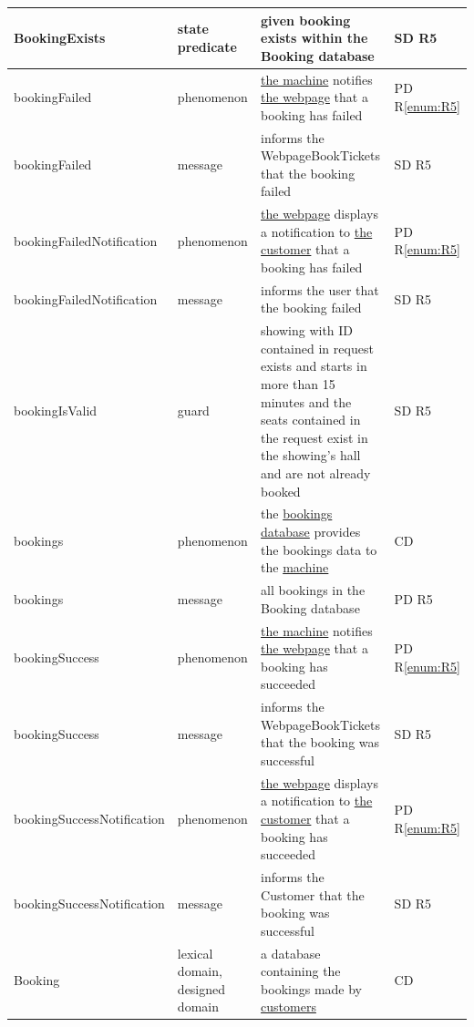 \documentclass[a4paper,10pt,titlepage,bibtotoc,bibtotocnumbered]{scrreprt}
\begin{document}
\begin{longtable}{|p{4.75cm}|p{3cm}|p{5cm}|l|}
BookingExists & state predicate & given booking exists within the Booking database & SD R5\\
\hline
\hypertarget{glossary:bookingFailed}{bookingFailed} & phenomenon & \hyperlink{glossary:UDEKino}{the machine} notifies \hyperlink{glossary:WebpageBookTickets}{the webpage} that a booking has failed & PD R\ref{enum:R5}\\
\hline
bookingFailed & message & informs the WebpageBookTickets that the booking failed & SD R5\\
\hline
\hypertarget{glossary:bookingFailedNotification}{bookingFailedNotification} & phenomenon & \hyperlink{glossary:WebpageBookTickets}{the webpage} displays a notification to \hyperlink{glossary:Customer}{the customer} that a booking has failed & PD R\ref{enum:R5}\\
\hline
bookingFailedNotification & message & informs the user that the booking failed & SD R5\\
\hline
bookingIsValid & guard & showing with ID contained in request exists and starts in more than 15 minutes and the seats contained in the request exist in the showing's hall and are not already booked & SD R5\\
\hline
\hypertarget{glossary:bookings}{bookings} & phenomenon & the \hyperlink{glossary:Booking}{bookings database} provides the bookings data to the \hyperlink{glossary:UDEKino}{machine} & CD\\
\hline
bookings & message & all bookings in the Booking database & PD R5\\
\hline
\hypertarget{glossary:bookingSuccess}{bookingSuccess} & phenomenon & \hyperlink{glossary:UDEKino}{the machine} notifies \hyperlink{glossary:WebpageBookTickets}{the webpage} that a booking has succeeded & PD R\ref{enum:R5}\\
\hline
bookingSuccess & message & informs the WebpageBookTickets that the booking was successful & SD R5\\
\hline
\hypertarget{glossary:bookingSuccessNotification}{bookingSuccessNotification} & phenomenon & \hyperlink{glossary:WebpageBookTickets}{the webpage} displays a notification to \hyperlink{glossary:Customer}{the customer} that a booking has succeeded & PD R\ref{enum:R5}\\
\hline
bookingSuccessNotification & message & informs the Customer that the booking was successful & SD R5\\
\hline
\hypertarget{glossary:Booking}{Booking} & lexical domain, designed domain & a database containing the bookings made by \hyperlink{glossary:Customer}{customers} & CD\\

\end{longtable}
\end{document}
